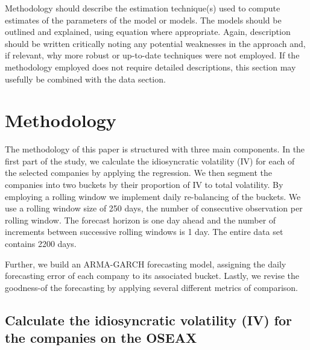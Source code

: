 Methodology should describe the estimation technique(s) used to compute estimates of the parameters of the model or models. The models should be outlined and explained, using equation where appropriate. Again, description should be written critically noting any potential weaknesses in the approach and, if relevant, why more robust or up-to-date techniques were not employed. If the methodology employed does not require detailed descriptions, this section may usefully be combined with the data section. 


\chapter{Methodology}

The methodology of this paper is structured with three main components. In the first part of the study, we calculate the idiosyncratic volatility (IV) for each of the selected companies by applying the \cite{famafrench} regression. We then segment the companies into two buckets by their proportion of IV to total volatility. By employing a rolling window we implement daily re-balancing of the buckets. We use a rolling window size of 250 days, the number of consecutive observation per rolling window. The forecast horizon is one day ahead and the number of increments between successive rolling windows is 1 day. The entire data set contains 2200 days. 

Further, we build an ARMA-GARCH forecasting model, assigning the daily forecasting error of each company to its associated bucket. Lastly, we revise the goodness-of the forecasting by applying several different metrics of comparison.

\section*{Calculate the idiosyncratic volatility (IV) for the companies on the OSEAX} 

